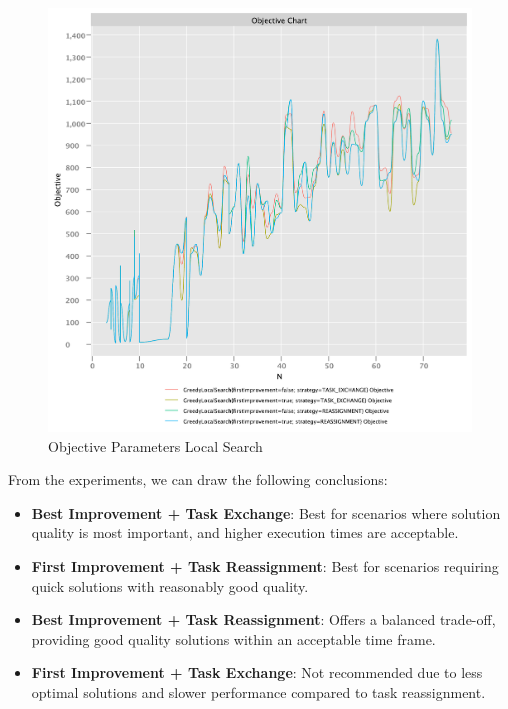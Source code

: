 \documentclass{article}
\begin{document}
\begin{figure}[!h]
    \centering
    \includegraphics[width=1\textwidth]{./documentation/assets/new.localSearchParams.objectiveChart.pdf}
    \caption{Objective Parameters Local Search}
    \label{fig:local_objective}
\end{figure}\FloatBarrier

From the experiments, we can draw the following conclusions:
\begin{itemize}
    \item \textbf{Best Improvement + Task Exchange}: Best for scenarios where solution quality is most important, and higher execution times are acceptable.
    \item \textbf{First Improvement + Task Reassignment}: Best for scenarios requiring quick solutions with reasonably good quality.
    \item \textbf{Best Improvement + Task Reassignment}: Offers a balanced trade-off, providing good quality solutions within an acceptable time frame.
    \item \textbf{First Improvement + Task Exchange}: Not recommended due to less optimal solutions and slower performance compared to task reassignment.
\end{itemize}
\end{document}
